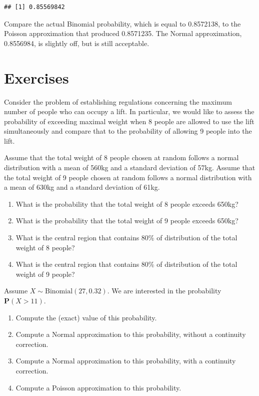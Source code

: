 \documentclass[]{krantz}
\newcommand{\Prob}{\mathbf{P}}
\theoremstyle{definition}
\theoremstyle{definition}
\theoremstyle{definition}
\theoremstyle{remark}
\let\BeginKnitrBlock\begin \let\EndKnitrBlock\end
\begin{document}
\begin{verbatim}
## [1] 0.85569842
\end{verbatim}

Compare the actual Binomial probability, which is equal to 0.8572138, to
the Poisson approximation that produced 0.8571235. The Normal
approximation, 0.8556984, is slightly off, but is still acceptable.

\hypertarget{Normal4}{%
\section{Exercises}\label{Normal4}}

\BeginKnitrBlock{exercise}
\protect\hypertarget{exr:unnamed-chunk-89}{}{\label{exr:unnamed-chunk-89} }Consider the problem of establishing regulations
concerning the maximum number of people who can occupy a lift. In
particular, we would like to assess the probability of exceeding maximal
weight when 8 people are allowed to use the lift simultaneously and
compare that to the probability of allowing 9 people into the lift.

Assume that the total weight of 8 people chosen at random follows a
normal distribution with a mean of 560kg and a standard deviation of
57kg. Assume that the total weight of 9 people chosen at random follows
a normal distribution with a mean of 630kg and a standard deviation of
61kg.

\begin{enumerate}
\def\labelenumi{\arabic{enumi}.}
\item
  What is the probability that the total weight of 8 people exceeds
  650kg?
\item
  What is the probability that the total weight of 9 people exceeds
  650kg?
\item
  What is the central region that contains 80\% of distribution of the
  total weight of 8 people?
\item
  What is the central region that contains 80\% of distribution of the
  total weight of 9 people?
\end{enumerate}
\EndKnitrBlock{exercise}

\BeginKnitrBlock{exercise}
\protect\hypertarget{exr:unnamed-chunk-90}{}{\label{exr:unnamed-chunk-90} }Assume \(X \sim \mbox{Binomial}(27,0.32)\). We are
interested in the probability \(\Prob(X > 11)\).

\begin{enumerate}
\def\labelenumi{\arabic{enumi}.}
\item
  Compute the (exact) value of this probability.
\item
  Compute a Normal approximation to this probability, without a
  continuity correction.
\item
  Compute a Normal approximation to this probability, with a
  continuity correction.
\item
  Compute a Poisson approximation to this probability.
\end{enumerate}
\EndKnitrBlock{exercise}
\end{document}
